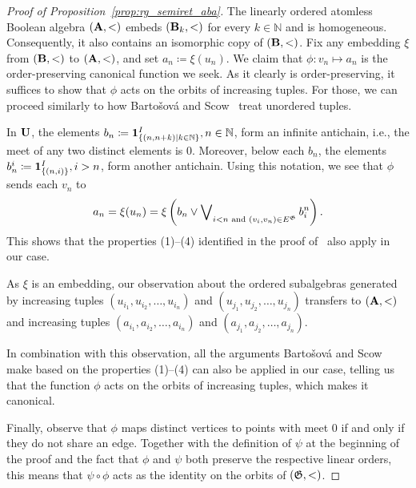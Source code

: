 \begin{proof}[Proof of Proposition~\ref{prop:rg_semiret_aba}]
    The linearly ordered atomless Boolean algebra $(\mathbf{A},<)$ embeds  $(\mathbf{B}_k,<)$ for every $k\in \mathbb{N}$ and is homogeneous.
    Consequently, it also contains an isomorphic copy of $(\mathbf{B},<)$.
    Fix any embedding $\xi$ from $(\mathbf{B},<)$ to $(\mathbf{A},<)$, and set  $a_n\coloneqq\xi(u_n)$. 
    We claim that $\phi\colon v_n\mapsto a_n$ is the order-preserving canonical function we seek.  
    As it clearly is order-preserving, it suffices to show that $\phi$ acts on the orbits of increasing tuples.
    For those, we can proceed similarly to how Barto\v{s}ov\'{a} and Scow~\cite{BARTOŠOVÁ_SCOW_2024} treat unordered tuples.

    In $\mathbf{U}$, the elements $b_n\mathrel{\mathop:}\mathrel{\mkern-1.2mu}= \mathbf{1}_{\{(n,n+k)\mid k\in\mathbb{N}\}}^{I},n\in\mathbb{N}$, form an infinite antichain, i.e., the meet of any two distinct elements is $0$.
    Moreover, below each $b_n$, the elements $b_n^i\mathrel{\mathop:}\mathrel{\mkern-1.2mu}=\mathbf{1}_{\{(n,i)\}}^{I},i>n$, form another antichain.
    Using this notation, we see that $\phi$ sends each $v_n$ to 
    \[
    a_n=\xi(u_n)=\xi\left( b_n\vee\bigvee\nolimits_{i<n \text{ and } (v_i,v_n)\in E^{\mathfrak{G}}}b_i^n\right).
    \]
    This shows that the properties  (1)--(4) identified in the proof of~\cite[Theorem~4.1]{BARTOŠOVÁ_SCOW_2024} also apply in our case.
    
    As $\xi$ is an embedding, our observation about the ordered subalgebras generated by increasing tuples $(u_{i_1},u_{i_2},\dots,u_{i_n})$ and $(u_{j_1},u_{j_2},\dots,u_{j_n})$ transfers to $(\mathbf{A},<)$ and increasing tuples $(a_{i_1},a_{i_2},\dots,a_{i_n})$ and $(a_{j_1},a_{j_2},\dots,a_{j_n})$.
    
    In combination with this observation, all the arguments Barto\v{s}ov\'a and Scow~\cite{BARTOŠOVÁ_SCOW_2024} make based on the properties (1)--(4) can also be applied in our case, telling us that the function $\phi$ acts on the orbits of increasing tuples, which makes it canonical.

    Finally, observe that $\phi$ maps distinct vertices to points with meet $0$ if and only if they do not share an edge. 
    Together with the definition of $\psi$ at the beginning of the proof and the fact that $\phi$ and $\psi$ both preserve the respective linear orders, this means that $\psi\circ\phi$ acts as the identity on the orbits of $(\mathfrak{G},<)$. 
\end{proof}
   